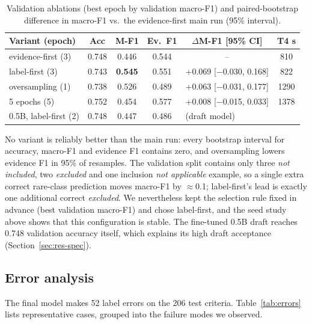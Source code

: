 \begin{table}[t]
\centering
\caption{Validation ablations (best epoch by validation macro-F1) and paired-bootstrap
difference in macro-F1 vs.\ the evidence-first main run (95\% interval).}
\label{tab:ablation}
\setlength{\tabcolsep}{2.5pt}
\begin{tabular}{lccccc}
\toprule
Variant (epoch) & Acc & M-F1 & Ev.\ F1 & $\Delta$M-F1 [95\% CI] & T4 s \\
\midrule
evidence-first (3) & 0.748 & 0.446 & 0.544 & -- & 810 \\
label-first (3) & 0.743 & \textbf{0.545} & 0.551 & +0.069 [$-$0.030, 0.168] & 822 \\
oversampling (1) & 0.738 & 0.526 & 0.489 & +0.063 [$-$0.031, 0.177] & 1290 \\
5 epochs (5) & 0.752 & 0.454 & 0.577 & +0.008 [$-$0.015, 0.033] & 1378 \\
\midrule
0.5B, label-first (2) & 0.748 & 0.447 & 0.486 & \multicolumn{2}{l}{(draft model)} \\
\bottomrule
\end{tabular}
\end{table}

No variant is reliably better than the main run: every bootstrap interval for accuracy, macro-F1
and evidence F1 contains zero, and oversampling lowers evidence F1 in 95\% of resamples. The
validation split contains only three \emph{not included}, two \emph{excluded} and one inclusion
\emph{not applicable} example, so a single extra correct rare-class prediction moves macro-F1 by
$\approx$0.1; label-first's lead is exactly one additional correct \emph{excluded}. We nevertheless
kept the selection rule fixed in advance (best validation macro-F1) and chose label-first, and the
seed study above shows that this configuration is stable. The fine-tuned 0.5B draft reaches 0.748
validation accuracy itself, which explains its high draft acceptance (Section~\ref{sec:res-spec}).

\subsection{Error analysis}
\label{sec:res-err}

The final model makes 52 label errors on the 206 test criteria. Table~\ref{tab:errors} lists
representative cases, grouped into the failure modes we observed.

